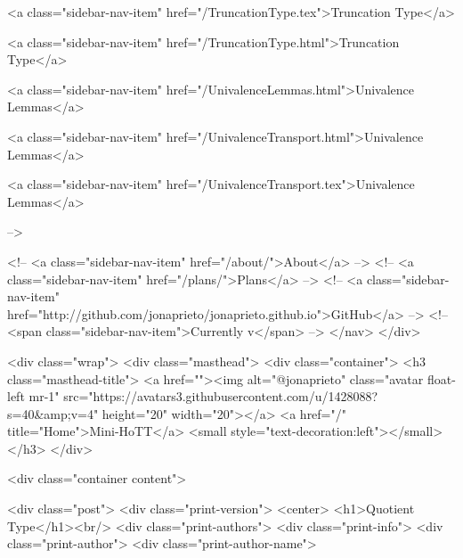       
    
      
        
          <a class="sidebar-nav-item" href="/TruncationType.tex">Truncation Type</a>
        
      
    
      
        
          <a class="sidebar-nav-item" href="/TruncationType.html">Truncation Type</a>
        
      
    
      
        
          <a class="sidebar-nav-item" href="/UnivalenceLemmas.html">Univalence Lemmas</a>
        
      
    
      
        
          <a class="sidebar-nav-item" href="/UnivalenceTransport.html">Univalence Lemmas</a>
        
      
    
      
        
          <a class="sidebar-nav-item" href="/UnivalenceTransport.tex">Univalence Lemmas</a>
        
      
     -->

    <!-- <a class="sidebar-nav-item" href="/about/">About</a> -->
    <!-- <a class="sidebar-nav-item" href="/plans/">Plans</a> -->
    <!-- <a class="sidebar-nav-item" href="http://github.com/jonaprieto/jonaprieto.github.io">GitHub</a> -->
    <!-- <span class="sidebar-nav-item">Currently v</span> -->
  </nav>
</div>

    <div class="wrap">
      <div class="masthead">
        <div class="container">
          <h3 class="masthead-title">
            <a href=""><img alt="@jonaprieto" class="avatar float-left mr-1" src="https://avatars3.githubusercontent.com/u/1428088?s=40&amp;v=4" height="20" width="20"></a>
            <a href="/" title="Home">Mini-HoTT</a>
            <small style="text-decoration:left"></small>
          </h3>
        </div>
      
      <div class="container content">
        







<div class="post">
  <div class="print-version">
    <center>
      <h1>Quotient Type</h1><br/>
        <div class="print-authors">
          <div class="print-info">
            <div class="print-author">
              <div class="print-author-name">
                
